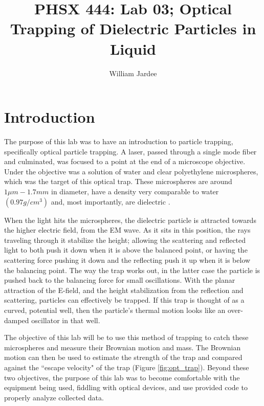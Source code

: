 \documentclass[12pt]{article}
\begin{document}
\title{PHSX 444: Lab 03; Optical Trapping of Dielectric Particles in Liquid}
\author{William Jardee}
\maketitle

\section{Introduction}
The purpose of this lab was to have an introduction to particle trapping, specifically optical particle trapping. A laser, passed through a single mode fiber and culminated, was focused to a point at the end of a microscope objective. Under the objective was a solution of water and clear polyethylene microspheres, which was the target of this optical trap. These microspheres are around $1 \mu m - 1.7 mm$  in diameter, have a density very comparable to water $(0.97 g/cm^3)$ and, most importantly, are dielectric \cite{microspheres}. 

When the light hits the microspheres, the dielectric particle is attracted towards the higher electric field, from the EM wave. As it sits in this position, the rays traveling through it stabilize the height; allowing the scattering and reflected light to both push it down when it is above the balanced point, or having the scattering force pushing it down and the reflecting push it up when it is below the balancing point. The way the trap works out, in the latter case the particle is pushed back to the balancing force for small oscillations. With the planar attraction of the E-field, and the height stabilization from the reflection and scattering, particles can effectively be trapped. If this trap is thought of as a curved,  potential well, then the particle's thermal motion looks like an over-damped oscillator in that well.

The objective of this lab will be to use this method of trapping to catch these microspheres and measure their Brownian motion and mass. The Brownian motion can then be used to estimate the strength of the trap and compared against the ``escape velocity" of the trap (Figure \ref{fig:opt_trap}). Beyond these two objectives, the purpose of this lab was to become comfortable with the equipment being used, fiddling with optical devices, and use provided code to properly analyze collected data.
\end{document}
